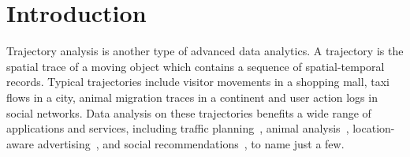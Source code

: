 \section{Introduction}
Trajectory analysis is another type of advanced data analytics. A trajectory is the spatial trace
of a moving object which contains a sequence of spatial-temporal records. Typical trajectories
include visitor movements in a shopping mall, taxi flows in a city, animal migration traces in a continent and user action logs in social networks.
Data analysis on these trajectories benefits a wide range of applications and services, including traffic planning~\cite{zheng2011urban}, animal analysis~\cite{li2010miningperiodic}, location-aware advertising~\cite{guo2016influence}, and social recommendations~\cite{bao2013survey}, to name just a few. 

